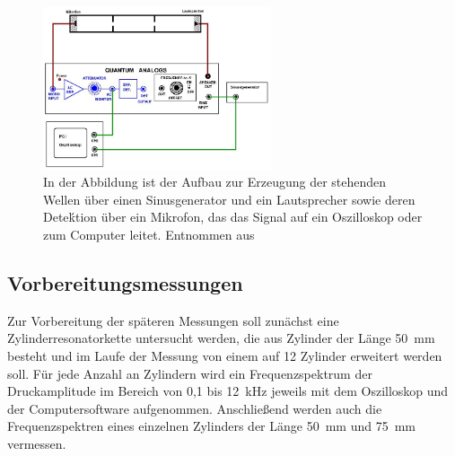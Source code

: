             \begin{figure}[h]
              \centering
              \includegraphics[width = 0.6\textwidth]{pictures/fk_aufbau.png}
              \caption{In der Abbildung ist der Aufbau zur Erzeugung der stehenden Wellen über einen Sinusgenerator und ein Lautsprecher sowie deren Deteḱtion über ein Mikrofon, das das Signal auf ein Oszilloskop oder zum Computer leitet. Entnommen aus~\cite{tu_dortmund_versuchsanleitung_2021-4}}
              \label{fig:fk_Aufbau}
            \end{figure}

            \FloatBarrier

            \noindent


    \subsection{Vorbereitungsmessungen}
        Zur Vorbereitung der späteren Messungen soll zunächst eine Zylinderresonatorkette untersucht werden, die aus Zylinder der Länge \SI{50}{\milli\metre} besteht und im Laufe der Messung von einem auf 12
        Zylinder erweitert werden soll. Für jede Anzahl an Zylindern wird ein Frequenzspektrum der Druckamplitude im Bereich von 0,1 bis \SI{12}{\kilo\hertz} jeweils mit dem Oszilloskop und der 
        Computersoftware aufgenommen. Anschließend werden auch die Frequenzspektren eines einzelnen Zylinders der Länge \SI{50}{\milli\metre} und \SI{75}{\milli\metre} vermessen.


